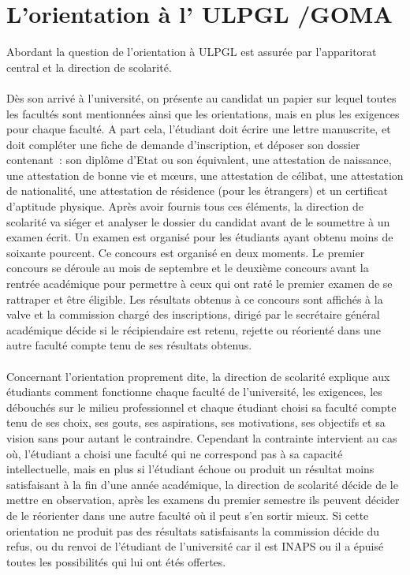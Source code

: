 \section{L'orientation à l' \ac{ULPGL} /GOMA  \cite{OrBk6} }
Abordant la question de l’orientation à \ac{ULPGL} est assurée par l’apparitorat  central et la direction de scolarité. 
\paragraph{}
Dès son arrivé à l’université, on présente au candidat un papier sur lequel toutes les facultés sont mentionnées ainsi que les orientations, mais en plus les exigences pour chaque faculté. 
 A part cela, l’étudiant doit écrire une lettre manuscrite, et doit compléter une fiche de demande d’inscription, et déposer son dossier contenant : son diplôme d’Etat ou son équivalent, une attestation de naissance, une attestation de bonne vie et mœurs, une attestation de célibat, une attestation de nationalité, une attestation de résidence  (pour les étrangers) et un certificat d’aptitude physique. Après avoir fournis tous ces éléments, la direction de scolarité va siéger et analyser le dossier du candidat avant de le soumettre à un examen écrit.   
Un examen est organisé pour les étudiants ayant obtenu moins de soixante pourcent. Ce concours est organisé en deux moments. Le premier concours se déroule au mois de septembre et le deuxième concours avant la rentrée académique  pour permettre à ceux qui ont raté le premier examen de se rattraper et être éligible. Les résultats obtenus à ce concours sont affichés à la valve et la commission chargé des inscriptions, dirigé par le secrétaire général académique décide si le récipiendaire est retenu, rejette ou réorienté dans une autre faculté compte tenu de ses résultats obtenus. 
\paragraph{}
Concernant l’orientation proprement dite, la direction de scolarité explique aux étudiants comment fonctionne chaque faculté de l’université, les exigences, les débouchés sur le milieu professionnel et chaque étudiant choisi sa faculté compte tenu de ses choix, ses gouts, ses aspirations, ses motivations, ses objectifs et sa vision sans pour autant le contraindre. Cependant la contrainte intervient au cas où, l’étudiant a choisi une faculté qui ne correspond pas à sa capacité intellectuelle, mais en plus si l’étudiant échoue ou produit un résultat moins satisfaisant à la fin d’une année académique, la direction de scolarité décide de le mettre en  observation, après les examens du premier semestre ils peuvent décider de le réorienter dans une autre faculté où il peut s’en sortir mieux.  Si cette orientation ne produit pas des résultats satisfaisants la commission décide du refus, ou du renvoi de l’étudiant de l’université car il est  \ac{INAPS} ou il a épuisé toutes les possibilités qui lui ont étés offertes. 


